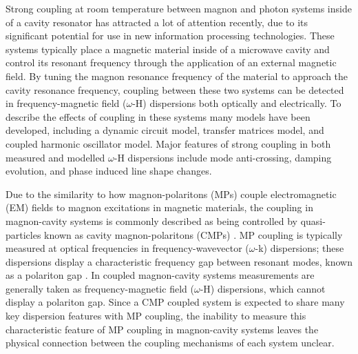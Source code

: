 \documentclass[prb,twocolumn,showpacs,preprintnumbers,amsmath,amssymb]{revtex4-1}
\begin{document}
Strong coupling at room temperature between magnon and photon systems inside of a cavity resonator has attracted a lot of attention recently\cite{A,B,C,D,E,F,G}, due to its significant potential for use in new information processing technologies\cite{H,I,II}. These systems typically place a magnetic material inside of a microwave cavity and control its resonant frequency through the application of an external magnetic field. By tuning the magnon resonance frequency of the material to approach the cavity resonance frequency, coupling between these two systems can be detected in frequency-magnetic field ($\omega$-H) dispersions both optically and electrically. To describe the effects of coupling in these systems many models have been developed, including a dynamic circuit model\cite{F}, transfer matrices model\cite{G,N}, and coupled harmonic oscillator model\cite{A,C,F,KK}. Major features of strong coupling in both measured and modelled $\omega$-H dispersions include mode anti-crossing, damping evolution, and phase induced line shape changes.



Due to the similarity to how magnon-polaritons (MPs) couple electromagnetic (EM) fields to magnon excitations in magnetic materials, the coupling in magnon-cavity systems is commonly described as being controlled by quasi-particles known as cavity magnon-polaritons (CMPs) \cite{N,P,R}. MP coupling is typically measured at optical frequencies in frequency-wavevector ($\omega$-k) dispersions; these dispersions display a characteristic frequency gap between resonant modes, known as a polariton gap \cite{K,L,M}. In coupled magnon-cavity systems measurements are generally taken as frequency-magnetic field ($\omega$-H) dispersions, which cannot display a polariton gap. Since a CMP coupled system is expected to share many key dispersion features with MP coupling, the inability to measure this characteristic feature of MP coupling in magnon-cavity systems leaves the physical connection between the coupling mechanisms of each system unclear. 
\end{document}

